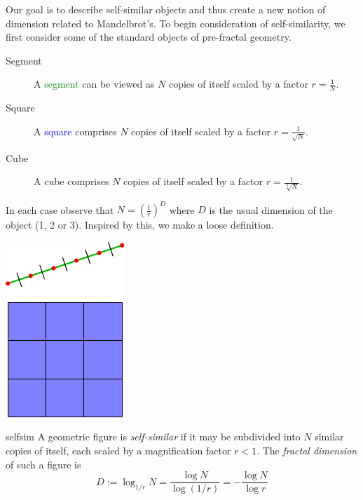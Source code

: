 Our goal is to describe self-similar objects and thus create a new notion of dimension related to Mandelbrot's. To begin consideration of self-similarity, we first consider some of the standard objects of pre-fractal geometry.\par
\begin{minipage}[t]{0.75\linewidth}\vspace{-5pt}
	\begin{description}
		\item[Segment] A \textcolor{Green}{segment} can be viewed as $N$ copies of itself scaled by a factor $r=\frac 1N$.
		\item[Square] A \textcolor{blue}{square} comprises $N$ copies of itself scaled by a factor $r=\frac 1{\sqrt N}$.
		\item[Cube] A cube comprises $N$ copies of itself scaled by a factor $r=\frac 1{\sqrt[3]{N}}$.
	\end{description}\vspace{-5pt}
	In each case observe that $N=\left(\frac 1r\right)^D$ where $D$ is the usual dimension of the object (1, 2 or 3). Inspired by this, we make a loose definition.
\end{minipage}
\hfill
\begin{minipage}[t]{0.24\linewidth}\vspace{-15pt}
	\flushright\includegraphics[scale=0.95]{self-sim-line}
\end{minipage}


\begin{defn}{}{selfsim}
	A geometric figure is \emph{self-similar} if it may be subdivided into $N$ similar copies of itself, each scaled by a magnification factor $r<1$. The \emph{fractal dimension} of such a figure is
	\[
		D:=\log_{1/r}N=\frac{\log N}{\log (1/r)}=-\frac{\log N}{\log r}
	\]
\end{defn}


